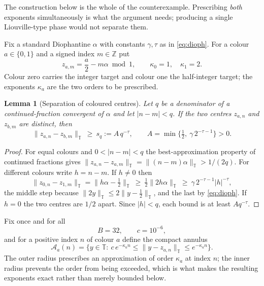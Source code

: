 \documentclass[11pt,reqno]{amsart}
\theoremstyle{plain}
\newtheorem{lemma}[theorem]{Lemma}
\theoremstyle{definition}
\theoremstyle{remark}
\numberwithin{equation}{section}
\begin{document}
The construction below is the whole of the counterexample. Prescribing
\emph{both}
exponents simultaneously is what the argument needs; producing a single
Liouville-type phase would not separate them.

Fix a standard Diophantine $\alpha$ with constants $\gamma,\tau$ as in
\eqref{eq:dioph}. For a colour $a\in\{0,1\}$ and a signed index
$m\in\mathbb Z$ put
\begin{equation}
  \label{eq:centers}
  z_{a,m}=\frac a2-m\alpha \bmod 1,
  \qquad
  \kappa_0=1,\quad \kappa_1=2 .
\end{equation}
Colour zero carries the integer target and colour one the half-integer
target; the exponents $\kappa_a$ are the two orders to be prescribed.

\begin{lemma}[Separation of coloured centres]
  \label{lem:separation}
  Let $q$ be a denominator of a continued-fraction convergent of $\alpha$
  and let $|n-m|<q$. If the two centres $z_{a,n}$ and $z_{b,m}$ are
  distinct, then
  \begin{equation}
    \label{eq:sq}
    \lVert z_{a,n}-z_{b,m}\rVert_{\mathbb T}\ \ge\ s_q:=A\,q^{-\tau},
    \qquad
    A=\min\{\tfrac12,\ \gamma\,2^{-\tau-1}\}>0 .
  \end{equation}
\end{lemma}

\begin{proof}
  For equal colours and $0<|n-m|<q$ the best-approximation property of
  continued fractions gives
  $\lVert z_{a,n}-z_{a,m}\rVert_{\mathbb T}
   =\lVert(n-m)\alpha\rVert_{\mathbb T}>1/(2q)$.
  For different colours write $h=n-m$. If $h\ne0$ then
  \begin{equation*}
    \lVert z_{0,n}-z_{1,m}\rVert_{\mathbb T}
    =\bigl\lVert h\alpha-\tfrac12\bigr\rVert_{\mathbb T}
    \ \ge\ \tfrac12\lVert 2h\alpha\rVert_{\mathbb T}
    \ \ge\ \gamma\,2^{-\tau-1}|h|^{-\tau},
  \end{equation*}
  the middle step because $\lVert2y\rVert_{\mathbb T}\le2\lVert y-\tfrac12\rVert_{\mathbb T}$,
  and the last by \eqref{eq:dioph}. If $h=0$ the two centres are $1/2$
  apart. Since $|h|<q$, each bound is at least $A q^{-\tau}$.
\end{proof}

Fix once and for all
\begin{equation}
  \label{eq:Bc}
  B=32,\qquad c=10^{-6},
\end{equation}
and for a positive index $n$ of colour $a$ define the compact annulus
\begin{equation}
  \label{eq:annulus}
  \mathcal A_a(n)
  =\bigl\{y\in\mathbb T:\
    c\,e^{-\kappa_a n}\le\lVert y-z_{a,n}\rVert_{\mathbb T}\le e^{-\kappa_a n}
  \bigr\}.
\end{equation}
The outer radius prescribes an approximation of order $\kappa_a$ at index
$n$; the inner radius prevents the order from being exceeded, which is what
makes the resulting exponents exact rather than merely bounded below.
\end{document}
